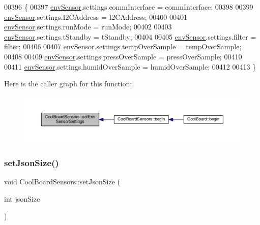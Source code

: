 \begin{DoxyCode}
00396 \{
00397   \hyperlink{class_cool_board_sensors_a868e38985e9a2412829fa2790ca13e2e}{envSensor}.settings.commInterface = commInterface;      
00398   
00399   \hyperlink{class_cool_board_sensors_a868e38985e9a2412829fa2790ca13e2e}{envSensor}.settings.I2CAddress = I2CAddress;
00400   
00401   \hyperlink{class_cool_board_sensors_a868e38985e9a2412829fa2790ca13e2e}{envSensor}.settings.runMode = runMode; 
00402   
00403   \hyperlink{class_cool_board_sensors_a868e38985e9a2412829fa2790ca13e2e}{envSensor}.settings.tStandby = tStandby; 
00404   
00405   \hyperlink{class_cool_board_sensors_a868e38985e9a2412829fa2790ca13e2e}{envSensor}.settings.filter = filter; 
00406   
00407   \hyperlink{class_cool_board_sensors_a868e38985e9a2412829fa2790ca13e2e}{envSensor}.settings.tempOverSample = tempOverSample;
00408   
00409   \hyperlink{class_cool_board_sensors_a868e38985e9a2412829fa2790ca13e2e}{envSensor}.settings.pressOverSample = pressOverSample;
00410   
00411   \hyperlink{class_cool_board_sensors_a868e38985e9a2412829fa2790ca13e2e}{envSensor}.settings.humidOverSample = humidOverSample;
00412 
00413 \}
\end{DoxyCode}
Here is the caller graph for this function\+:
\nopagebreak
\begin{figure}[H]
\begin{center}
\leavevmode
\includegraphics[width=350pt]{class_cool_board_sensors_a406307ffd70272282d91479c7ed8d66f_icgraph}
\end{center}
\end{figure}
\mbox{\label{class_cool_board_sensors_ab76e6dbd6efbcc25ff460535badd8d45}} 
\subsubsection{\texorpdfstring{set\+Json\+Size()}{setJsonSize()}}
{\footnotesize\ttfamily void Cool\+Board\+Sensors\+::set\+Json\+Size (\begin{DoxyParamCaption}\item[{int}]{json\+Size }\end{DoxyParamCaption})}

